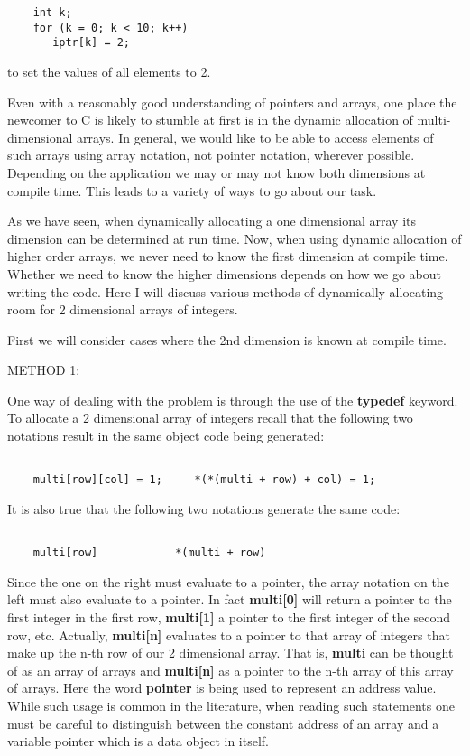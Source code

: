 \begin{verbatim}
    int k;
    for (k = 0; k < 10; k++)
       iptr[k] = 2;
\end{verbatim}

to set the values of all elements to 2.

Even with a reasonably good understanding of pointers and arrays, one
place the newcomer to C is likely to stumble at first is in the dynamic
allocation of multi-dimensional arrays. In general, we would like to be
able to access elements of such arrays using array notation, not pointer
notation, wherever possible. Depending on the application we may or may
not know both dimensions at compile time. This leads to a variety of
ways to go about our task.

As we have seen, when dynamically allocating a one dimensional array its
dimension can be determined at run time. Now, when using dynamic
allocation of higher order arrays, we never need to know the first
dimension at compile time. Whether we need to know the higher dimensions
depends on how we go about writing the code. Here I will discuss various
methods of dynamically allocating room for 2 dimensional arrays of
integers.

First we will consider cases where the 2nd dimension is known at compile
time.

METHOD 1:

One way of dealing with the problem is through the use of the
\textbf{typedef} keyword. To allocate a 2 dimensional array of integers
recall that the following two notations result in the same object code
being generated:

\begin{verbatim}

    multi[row][col] = 1;     *(*(multi + row) + col) = 1;
\end{verbatim}

It is also true that the following two notations generate the same code:

\begin{verbatim}

    multi[row]            *(multi + row)
\end{verbatim}

Since the one on the right must evaluate to a pointer, the array
notation on the left must also evaluate to a pointer. In fact
\textbf{multi{[}0{]}} will return a pointer to the first integer in the
first row, \textbf{multi{[}1{]}} a pointer to the first integer of the
second row, etc. Actually, \textbf{multi{[}n{]}} evaluates to a pointer
to that array of integers that make up the n-th row of our 2 dimensional
array. That is, \textbf{multi} can be thought of as an array of arrays
and \textbf{multi{[}n{]}} as a pointer to the n-th array of this array
of arrays. Here the word \textbf{pointer} is being used to represent an
address value. While such usage is common in the literature, when
reading such statements one must be careful to distinguish between the
constant address of an array and a variable pointer which is a data
object in itself.


